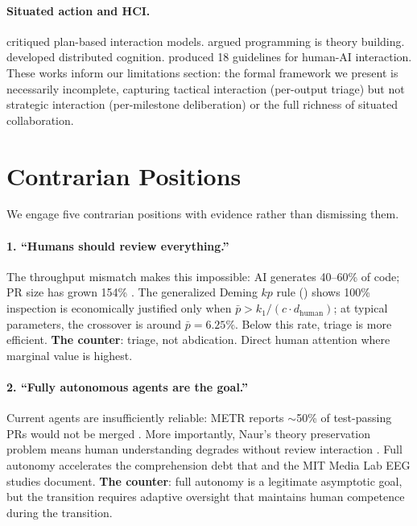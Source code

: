 \documentclass[11pt, a4paper, copyright]{googledeepmind}
\begin{document}
\paragraph{Situated action and HCI.} \citet{suchman1987plans} critiqued plan-based interaction models. \citet{naur1985programming} argued programming is theory building. \citet{hutchins1995cognition} developed distributed cognition. \citet{amershi2019guidelines} produced 18 guidelines for human-AI interaction. These works inform our limitations section: the formal framework we present is necessarily incomplete, capturing tactical interaction (per-output triage) but not strategic interaction (per-milestone deliberation) or the full richness of situated collaboration.

\section{Contrarian Positions}
\label{sec:contrarian}

We engage five contrarian positions with evidence rather than dismissing them.

\paragraph{1. ``Humans should review everything.''} The throughput mismatch makes this impossible: AI generates 40--60\% of code; PR size has grown 154\% \citep{dora2025}. The generalized Deming $kp$ rule () shows 100\% inspection is economically justified only when $\bar{p} > k_1/(c \cdot d_{\text{human}})$; at typical parameters, the crossover is around $\bar{p} = 6.25\%$. Below this rate, triage is more efficient. \textbf{The counter}: triage, not abdication. Direct human attention where marginal value is highest.

\paragraph{2. ``Fully autonomous agents are the goal.''}  Current agents are insufficiently reliable: METR reports $\sim$50\% of test-passing PRs would not be merged \citep{metr2026}. More importantly, Naur's theory preservation problem means human understanding degrades without review interaction \citep{naur1985programming}. Full autonomy accelerates the comprehension debt that \citet{suchman2007human} and the MIT Media Lab EEG studies document. \textbf{The counter}: full autonomy is a legitimate asymptotic goal, but the transition requires adaptive oversight that maintains human competence during the transition.
\end{document}
